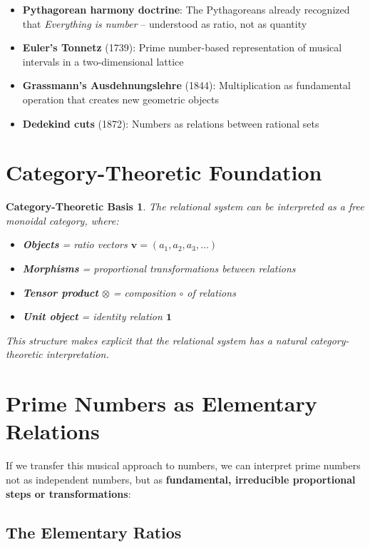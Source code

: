\documentclass[11pt,a4paper]{article}
\newcommand{\primrel}[1]{\mathbf{#1}}
\newcommand{\vect}[1]{\boldsymbol{#1}}
\newtheorem{category}{Category-Theoretic Basis}[section]
\begin{document}
	\begin{itemize}
		\item \textbf{Pythagorean harmony doctrine}: The Pythagoreans already recognized that \emph{Everything is number} -- understood as ratio, not as quantity
		\item \textbf{Euler's Tonnetz} (1739): Prime number-based representation of musical intervals in a two-dimensional lattice
		\item \textbf{Grassmann's Ausdehnungslehre} (1844): Multiplication as fundamental operation that creates new geometric objects
		\item \textbf{Dedekind cuts} (1872): Numbers as relations between rational sets
	\end{itemize}
	
	\section{Category-Theoretic Foundation}
	
	\begin{category}
		The relational system can be interpreted as a free monoidal category, where:
		\begin{itemize}
			\item \textbf{Objects} = ratio vectors $\vect{v} = (a_1, a_2, a_3, \ldots)$
			\item \textbf{Morphisms} = proportional transformations between relations
			\item \textbf{Tensor product} $\otimes$ = composition $\circ$ of relations
			\item \textbf{Unit object} = identity relation $\primrel{1}$
		\end{itemize}
		
		This structure makes explicit that the relational system has a natural category-theoretic interpretation.
	\end{category}
	
	\section{Prime Numbers as Elementary Relations}
	
	If we transfer this musical approach to numbers, we can interpret prime numbers not as independent numbers, but as \textbf{fundamental, irreducible proportional steps or transformations}:
	
	\subsection{The Elementary Ratios}
	
\end{document}
